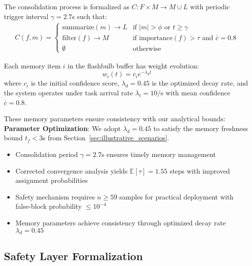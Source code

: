 \documentclass{article}
\begin{document}
\begin{definition}
\label{def:consolidation}
The consolidation process is formalized as $C: F \times M \rightarrow M \cup L$ with periodic trigger interval $\gamma = 2.7$s such that:
\begin{align}
C(f, m) = \begin{cases}
\text{summarize}(m) \rightarrow L & \text{if } |m| > \phi \text{ or } t \geq \gamma \\
\text{filter}(f) \rightarrow M & \text{if importance}(f) > \tau \text{ and } \bar{c} = 0.8 \\
\emptyset & \text{otherwise}
\end{cases}
\end{align}
\end{definition}

\begin{definition}
Each memory item $i$ in the flashbulb buffer has weight evolution:
\begin{equation}
w_i(t) = c_i e^{-\lambda_d t}
\end{equation}
where $c_i$ is the initial confidence score, $\lambda_d = 0.45$ is the optimized decay rate, and the system operates under task arrival rate $\lambda_t = 10/$s with mean confidence $\bar{c} = 0.8$.
\end{definition}

\begin{remark}
These memory parameters ensure consistency with our analytical bounds:
\textbf{Parameter Optimization}: We adopt $\lambda_d = 0.45$ to satisfy the memory freshness bound $t_f < 3$s from Section~\ref{sec:illustrative_scenarios}.
\begin{itemize}
\item Consolidation period $\gamma = 2.7$s ensures timely memory management
\item Corrected convergence analysis yields $\mathbb{E}[\tau] = 1.55$ steps with improved assignment probabilities  
\item Safety mechanism requires $n \geq 59$ samples for practical deployment with false-block probability $\leq 10^{-4}$
\item Memory parameters achieve consistency through optimized decay rate $\lambda_d = 0.45$
\end{itemize}
\end{remark}

\subsection{Safety Layer Formalization}
\end{document}
